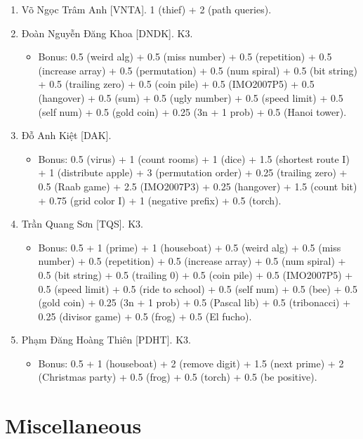\documentclass{article}
\begin{document}
\begin{enumerate}
	\item {\sc Võ Ngọc Trâm Anh [VNTA].} 1 (thief) + 2 (path queries).
    \item {\sc Đoàn Nguyễn Đăng Khoa [DNDK].} K3.
    \begin{itemize}
        \item Bonus: 0.5 (weird alg) + 0.5 (miss number) + 0.5 (repetition) + 0.5 (increase array) + 0.5 (permutation) + 0.5 (num spiral) + 0.5 (bit string) + 0.5 (trailing zero) + 0.5 (coin pile) + 0.5 (IMO2007P5) + 0.5 (hangover) + 0.5 (sum) + 0.5 (ugly number) + 0.5 (speed limit) + 0.5 (self num) + 0.5 (gold coin) + 0.25 (3n + 1 prob) + 0.5 (Hanoi tower).
    \end{itemize}
	\item {\sc Đỗ Anh Kiệt [DAK].}
	\begin{itemize}
		\item Bonus: 0.5 (virus) + 1 (count rooms) + 1 (dice) + 1.5 (shortest route I)  + 1 (distribute apple) + 3 (permutation order) + 0.25 (trailing zero) + 0.5 (Raab game) + 2.5 (IMO2007P3) + 0.25 (hangover) + 1.5 (count bit) + 0.75 (grid color I) + 1 (negative prefix) + 0.5 (torch).
	\end{itemize}
	\item {\sc Trần Quang Sơn [TQS].} K3.
	\begin{itemize}
		\item Bonus: 0.5 + 1 (prime) + 1 (houseboat) + 0.5 (weird alg) + 0.5 (miss number) + 0.5 (repetition) + 0.5 (increase array) + 0.5 (num spiral) + 0.5 (bit string) + 0.5 (trailing 0) + 0.5 (coin pile) + 0.5 (IMO2007P5) + 0.5 (speed limit) + 0.5 (ride to school) + 0.5 (self num) + 0.5 (bee) + 0.5 (gold coin) + 0.25 (3n + 1 prob) + 0.5 (Pascal lib) + 0.5 (tribonacci) + 0.25 (divisor game) + 0.5 (frog) + 0.5 (El fucho).
	\end{itemize}
	\item {\sc Phạm Đăng Hoàng Thiên [PDHT].} K3.
		\begin{itemize}
		\item Bonus: 0.5 + 1 (houseboat) + 2 (remove digit) + 1.5 (next prime) + 2 (Christmas party) + 0.5 (frog) + 0.5 (torch) + 0.5 (be positive).
	\end{itemize}
\end{enumerate}


\section{Miscellaneous}


\printbibliography[heading=bibintoc]
\end{document}
